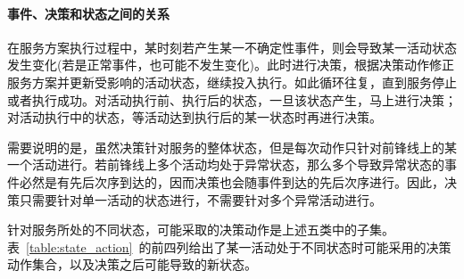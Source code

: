 \paragraph{事件、决策和状态之间的关系}

在服务方案执行过程中，某时刻若产生某一不确定性事件，则会导致某一活动状态发生变化(若是正常事件，也可能不发生变化)。此时进行决策，根据决策动作修正服务方案并更新受影响的活动状态，继续投入执行。如此循环往复，直到服务停止或者执行成功。对活动执行前、执行后的状态，一旦该状态产生，马上进行决策；对活动执行中的状态，等活动达到执行后的某一状态时再进行决策。

需要说明的是，虽然决策针对服务的整体状态，但是每次动作只针对前锋线上的某一个活动进行。若前锋线上多个活动均处于异常状态，那么多个导致异常状态的事件必然是有先后次序到达的，因而决策也会随事件到达的先后次序进行。因此，决策只需要针对单一活动的状态进行，不需要针对多个异常活动进行。

针对服务所处的不同状态，可能采取的决策动作是上述五类中的子集。表~\ref{table:state_action}~的前四列给出了某一活动处于不同状态时可能采用的决策动作集合，以及决策之后可能导致的新状态。


